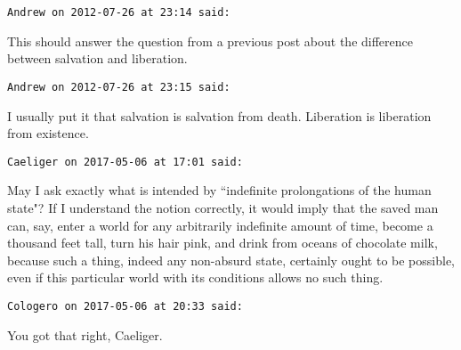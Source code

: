 \begin{footnotesize}\begin{sffamily}



\texttt{Andrew on 2012-07-26 at 23:14 said: }

This should answer the question from a previous post about the difference between salvation and liberation.


\hfill

\texttt{Andrew on 2012-07-26 at 23:15 said: }

I usually put it that salvation is salvation from death. Liberation is liberation from existence.


\hfill

\texttt{Caeliger on 2017-05-06 at 17:01 said: }

May I ask exactly what is intended by ``indefinite prolongations of the human state"? If I understand the notion correctly, it would imply that the saved man can, say, enter a world for any arbitrarily indefinite amount of time, become a thousand feet tall, turn his hair pink, and drink from oceans of chocolate milk, because such a thing, indeed any non-absurd state, certainly ought to be possible, even if this particular world with its conditions allows no such thing.


\hfill

\texttt{Cologero on 2017-05-06 at 20:33 said: }

You got that right, Caeliger.


\end{sffamily}\end{footnotesize}
